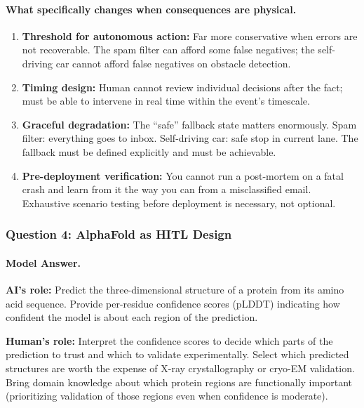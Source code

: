 \paragraph{What specifically changes when consequences are physical.}

\begin{enumerate}
    \item \textbf{Threshold for autonomous action:} Far more conservative when errors are not recoverable. The spam filter can afford some false negatives; the self-driving car cannot afford false negatives on obstacle detection.

    \item \textbf{Timing design:} Human cannot review individual decisions after the fact; must be able to intervene in real time within the event's timescale.

    \item \textbf{Graceful degradation:} The ``safe'' fallback state matters enormously. Spam filter: everything goes to inbox. Self-driving car: safe stop in current lane. The fallback must be defined explicitly and must be achievable.

    \item \textbf{Pre-deployment verification:} You cannot run a post-mortem on a fatal crash and learn from it the way you can from a misclassified email. Exhaustive scenario testing before deployment is necessary, not optional.
\end{enumerate}

\subsubsection{Question 4: AlphaFold as HITL Design}

\paragraph{Model Answer.}

\textbf{AI's role:} Predict the three-dimensional structure of a protein from its amino acid sequence. Provide per-residue confidence scores (pLDDT) indicating how confident the model is about each region of the prediction.

\textbf{Human's role:} Interpret the confidence scores to decide which parts of the prediction to trust and which to validate experimentally. Select which predicted structures are worth the expense of X-ray crystallography or cryo-EM validation. Bring domain knowledge about which protein regions are functionally important (prioritizing validation of those regions even when confidence is moderate).

